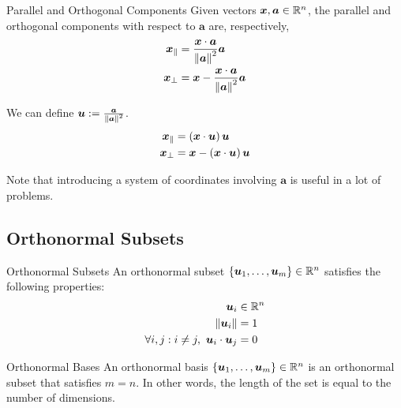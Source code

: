 \documentclass[11pt]{article}
\begin{document}
\begin{definition}{Parallel and Orthogonal Components}
  Given vectors $\bm{x}, \bm{a} \in \mathbb R^n$, the parallel and orthogonal components with respect to $\bm{a}$ are, respectively,
  \begin{align*}
    \bm{x}_{\parallel} &= \frac{\bm{x} \cdot \bm{a}}{\left\lVert\bm{a}\right\rVert^2} \bm{a} \\
    \bm{x}_{\perp} &= \bm{x} - \frac{\bm{x} \cdot \bm{a}}{\left\lVert\bm{a}\right\rVert^2} \bm{a} \\
  \end{align*}

  We can define $\bm{u} := \frac{\bm{a}}{\left\lVert\bm{a}\right\rVert^2}$.
    \begin{align*}
    \bm{x}_{\parallel} &= \left ( \bm{x} \cdot \bm{u} \right) \bm{u} \\
    \bm{x}_{\perp} &= \bm{x} - \left ( \bm{x} \cdot \bm{u} \right) \bm{u} \\
  \end{align*}
\end{definition}

Note that introducing a system of coordinates involving $\bm{a}$ is useful in a lot of problems.

\subsection{Orthonormal Subsets}

\begin{definition}{Orthonormal Subsets}
  An orthonormal subset $\left \{ \bm{u}_1, \dots, \bm{u}_m \right \} \in \mathbb R^n$ satisfies the following properties:
  \begin{align*}
    \bm{u}_i & \in \mathbb R^n \\
    \left\lVert\bm{u}_i\right\rVert &= 1 \\
    \forall i, j: i \neq j,\ \bm{u}_i \cdot \bm{u}_j &= 0 \\
  \end{align*}
\end{definition}

\begin{definition}{Orthonormal Bases}
  An orthonormal basis $\left \{ \bm{u}_1, \dots, \bm{u}_m \right \} \in \mathbb R^n$ is an orthonormal subset that satisfies $m = n$.
  In other words, the length of the set is equal to the number of dimensions.
\end{definition}
\end{document}
